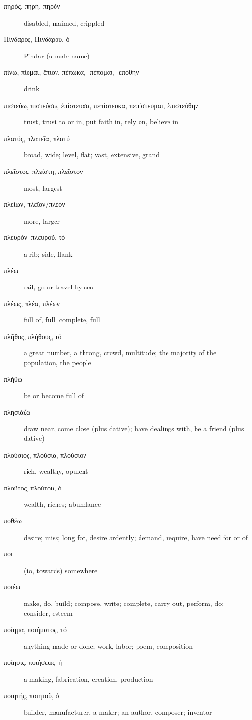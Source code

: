 \documentclass[12pt,letterpaper]{article}
\begin{document}
\begin{description}
    \item[\textgreek{πηρός, πηρή, πηρόν}] disabled, maimed, crippled
    \item[\textgreek{Πίνδαρος, Πινδάρου, ὁ}] Pindar (a male name)
    \item[\textgreek{πίνω, πίομαι, ἔπιον, πέπωκα, -πέπομαι, -επόθην}] \marginnote{*}drink
    \item[\textgreek{πιστεύω, πιστεύσω, ἐπίστευσα, πεπίστευκα, πεπίστευμαι, ἐπιστεύθην}] \marginnote{*}trust, trust to or in, put faith in, rely on, believe in
    \item[\textgreek{πλατύς, πλατεῖα, πλατύ}] broad, wide; level, flat; vast, extensive, grand
    \item[\textgreek{πλεῖστος, πλείστη, πλεῖστον}] \marginnote{*}most, largest
    \item[\textgreek{πλείων, πλεῖον/πλέον}] \marginnote{*}more, larger
    \item[\textgreek{πλευρόν, πλευροῦ, τό}] a rib; side, flank
    \item[\textgreek{πλέω}] sail, go or travel by sea
    \item[\textgreek{πλέως, πλέα, πλέων}] full of, full; complete, full
    \item[\textgreek{πλῆθος, πλήθους, τό}] \marginnote{*}a great number, a throng, crowd, multitude; the majority of the population, the people
    \item[\textgreek{πλήθω}] be or become full of
    \item[\textgreek{πλησιάζω}] draw near, come close (plus dative); have dealings with, be a friend (plus dative)
    \item[\textgreek{πλούσιος, πλούσια, πλούσιον}] rich, wealthy, opulent
    \item[\textgreek{πλοῦτος, πλούτου, ὁ}] wealth, riches; abundance
    \item[\textgreek{ποθέω}] desire; miss; long for, desire ardently; demand, require, have need for or of
    \item[\textgreek{ποι}] (to, towards) somewhere
    \item[\textgreek{ποιέω}] make, do, build; compose, write; complete, carry out, perform, do; consider, esteem
    \item[\textgreek{ποίημα, ποιήματος, τό}] anything made or done; work, labor; poem, composition 
    \item[\textgreek{ποίησις, ποιήσεως, ἡ}] a making, fabrication, creation, production
    \item[\textgreek{ποιητής, ποιητοῦ, ὁ}] builder, manufacturer, a maker; an author, composer; inventor

\end{description}
\end{document}
